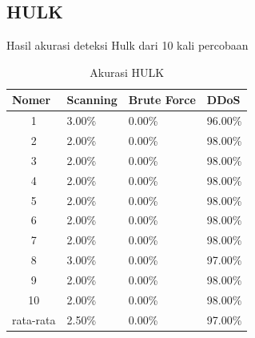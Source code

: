 \subsection{HULK}
Hasil akurasi deteksi Hulk dari 10 kali percobaan
\begin{table}[H]
	\centering
	\caption{Akurasi HULK}
	\label{Akurasi HULK}
	\begin{tabular}{|c|l|l|l|}
		\hline
		\multicolumn{1}{|l|}{Nomer}     & Scanning & Brute Force & DDoS    \\ \hline
		1                               & 3.00\%   & 0.00\%      & 96.00\% \\ \hline
		2                               & 2.00\%   & 0.00\%      & 98.00\% \\ \hline
		3                               & 2.00\%   & 0.00\%      & 98.00\% \\ \hline
		4                               & 2.00\%   & 0.00\%      & 98.00\% \\ \hline
		5                               & 2.00\%   & 0.00\%      & 98.00\% \\ \hline
		6                               & 2.00\%   & 0.00\%      & 98.00\% \\ \hline
		7                               & 2.00\%   & 0.00\%      & 98.00\% \\ \hline
		8                               & 3.00\%   & 0.00\%      & 97.00\% \\ \hline
		9                               & 2.00\%   & 0.00\%      & 98.00\% \\ \hline
		10                              & 2.00\%   & 0.00\%      & 98.00\% \\ \hline
		\multicolumn{1}{|l|}{rata-rata} & 2.50\%   & 0.00\%      & 97.00\% \\ \hline
	\end{tabular}
\end{table}


